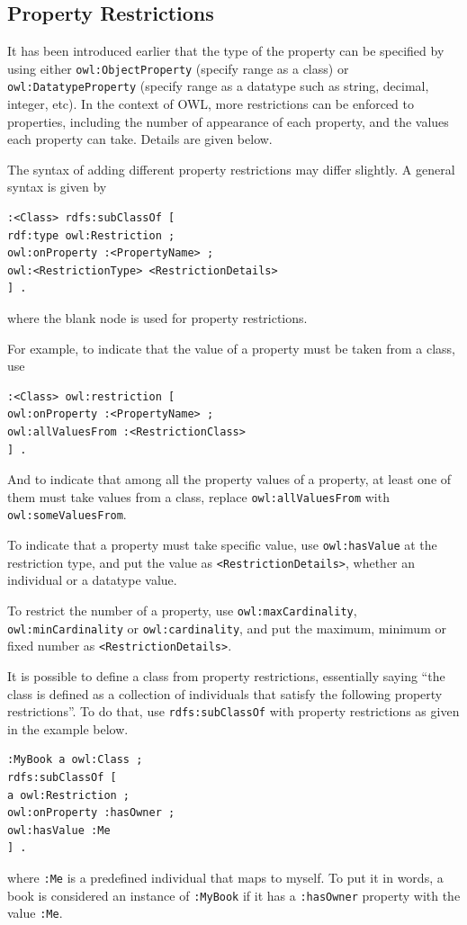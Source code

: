 \subsection{Property Restrictions}

It has been introduced earlier that the type of the property can be specified by using either \verb|owl:ObjectProperty| (specify range as a class) or \verb|owl:DatatypeProperty| (specify range as a datatype such as string, decimal, integer, etc). In the context of OWL, more restrictions can be enforced to properties, including the number of appearance of each property, and the values each property can take. Details are given below.

The syntax of adding different property restrictions may differ slightly. A general syntax is given by
\begin{lstlisting}
:<Class> rdfs:subClassOf [
rdf:type owl:Restriction ;
owl:onProperty :<PropertyName> ;
owl:<RestrictionType> <RestrictionDetails>
] .
\end{lstlisting}
where the blank node is used for property restrictions.

For example, to indicate that the value of a property must be taken from a class, use
\begin{lstlisting}
:<Class> owl:restriction [
owl:onProperty :<PropertyName> ;
owl:allValuesFrom :<RestrictionClass>
] .
\end{lstlisting}
And to indicate that among all the property values of a property, at least one of them must take values from a class, replace \verb|owl:allValuesFrom| with \verb|owl:someValuesFrom|.

To indicate that a property must take specific value, use \verb|owl:hasValue| at the restriction type, and put the value as \verb|<RestrictionDetails>|, whether an individual or a datatype value.

To restrict the number of a property, use \verb|owl:maxCardinality|, \verb|owl:minCardinality| or \verb|owl:cardinality|, and put the maximum, minimum or fixed number as \verb|<RestrictionDetails>|.

It is possible to define a class from property restrictions, essentially saying ``the class is defined as a collection of individuals that satisfy the following property restrictions''. To do that, use \verb|rdfs:subClassOf| with property restrictions as given in the example below.
\begin{lstlisting}
:MyBook a owl:Class ;
rdfs:subClassOf [
a owl:Restriction ;
owl:onProperty :hasOwner ;
owl:hasValue :Me
] .
\end{lstlisting}
where \verb|:Me| is a predefined individual that maps to myself. To put it in words, a book is considered an instance of \verb|:MyBook| if it has a \verb|:hasOwner| property with the value \verb|:Me|.

